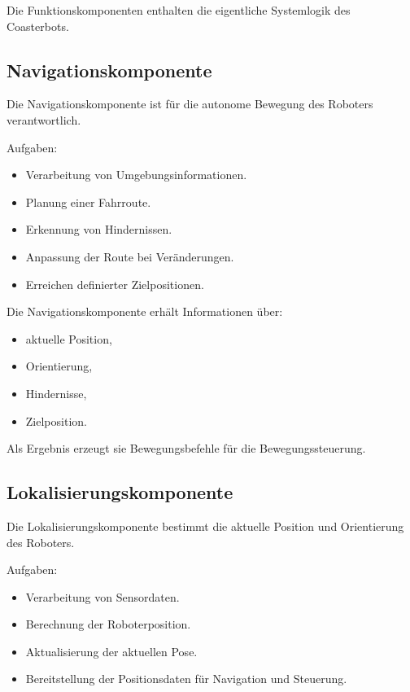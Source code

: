 \documentclass[
  a4paper,
  12pt,
  DIV=12,        %
  parskip=half,  %
  headings=small %
]{scrartcl}
\theoremstyle{definition}
\providecommand{\tightlist}{%
  \setlength{\itemsep}{0pt}\setlength{\parskip}{0pt}}
\theoremstyle{definition}
\begin{document}
Die Funktionskomponenten enthalten die eigentliche Systemlogik des
Coasterbots.

\subsection{Navigationskomponente}\label{navigationskomponente-1}

Die Navigationskomponente ist für die autonome Bewegung des Roboters
verantwortlich.

Aufgaben:

\begin{itemize}
\tightlist
\item
  Verarbeitung von Umgebungsinformationen.
\item
  Planung einer Fahrroute.
\item
  Erkennung von Hindernissen.
\item
  Anpassung der Route bei Veränderungen.
\item
  Erreichen definierter Zielpositionen.
\end{itemize}

Die Navigationskomponente erhält Informationen über:

\begin{itemize}
\tightlist
\item
  aktuelle Position,
\item
  Orientierung,
\item
  Hindernisse,
\item
  Zielposition.
\end{itemize}

Als Ergebnis erzeugt sie Bewegungsbefehle für die Bewegungssteuerung.

\subsection{Lokalisierungskomponente}\label{lokalisierungskomponente-1}

Die Lokalisierungskomponente bestimmt die aktuelle Position und
Orientierung des Roboters.

Aufgaben:

\begin{itemize}
\tightlist
\item
  Verarbeitung von Sensordaten.
\item
  Berechnung der Roboterposition.
\item
  Aktualisierung der aktuellen Pose.
\item
  Bereitstellung der Positionsdaten für Navigation und Steuerung.
\end{itemize}
\end{document}
